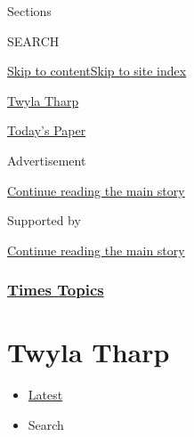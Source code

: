 Sections

SEARCH

\protect\hyperlink{site-content}{Skip to
content}\protect\hyperlink{site-index}{Skip to site index}

\href{https://www.nytimes3xbfgragh.onion/topic/person/twyla-tharp}{Twyla
Tharp}

\href{https://myaccount.nytimes3xbfgragh.onion/auth/login?response_type=cookie\&client_id=vi}{}

\href{https://www.nytimes3xbfgragh.onion/section/todayspaper}{Today's
Paper}

Advertisement

\protect\hyperlink{after-top}{Continue reading the main story}

Supported by

\protect\hyperlink{after-sponsor}{Continue reading the main story}

\hypertarget{times-topics}{%
\subsubsection{\texorpdfstring{\href{/index.html}{Times
Topics}}{Times Topics}}\label{times-topics}}

\hypertarget{twyla-tharp}{%
\section{Twyla Tharp}\label{twyla-tharp}}

\begin{itemize}
\tightlist
\item
  \protect\hyperlink{stream-panel}{Latest}
\item
  Search
\end{itemize}

